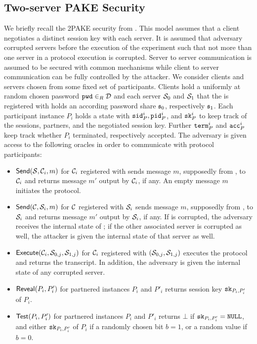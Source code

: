 \subsection{Two-server PAKE Security}
We briefly recall the \ac{2PAKE} security from \citet{Katz2012a}.
This model assumes that a client negotiates a distinct session key with each server.
It is assumed that adversary \cA corrupted servers before the execution of the experiment such that not more than one server in a protocol execution is corrupted.
Server to server communication is assumed to be secured with common mechanisms while client to server communication can be fully controlled by the attacker.
We consider clients \Client and servers \Server chosen from some fixed set of participants.
Clients hold a uniformly at random chosen password $\mathtt{pwd}\in_R\mathcal{D}$ and each server $\mathcal{S}_0$ and $\mathcal{S}_1$ that the is registered with holds an according password share $\mathfrak{s}_0$, respectively $\mathfrak{s}_1$.
Each participant instance $P_i$ holds a state with $\mathtt{sid}_P^i, \mathtt{pid}_P^i$, and $\mathtt{sk}_P^i$ to keep track of the sessions, partners, and the negotiated session key.
Further $\mathtt{term}_P^i$ and $\mathtt{acc}_P^i$ keep track whether $P_i$ terminated, respectively accepted.
The adversary is given access to the following oracles in order to communicate with protocol participants:

\begin{itemize}
  \item $\mathsf{Send}(\mathcal{S}, \mathcal{C}_i, m)$ for $\mathcal{C}_i$ registered with \Server sends message $m$, supposedly from \Server, to $\mathcal{C}_i$ and returns message $m'$ output by $\mathcal{C}_i$, if any.
    An empty message $m$ initiates the protocol.
  
  \item $\mathsf{Send}(\mathcal{C}, \mathcal{S}_i, m)$ for $\mathcal{C}$ registered with $\mathcal{S}_i$ sends message $m$, supposedly from \Client, to $\mathcal{S}_i$ and returns message $m'$ output by $\mathcal{S}_i$, if any.
    If \Server is corrupted, the adversary receives the internal state of \Server; if the other associated server is corrupted as well, the attacker is given the internal state of that server as well.
    
  \item $\mathsf{Execute}(\mathcal{C}_i, \mathcal{S}_{0,j}, \mathcal{S}_{1,j})$ for $\mathcal{C}_i$ registered with $(\mathcal{S}_{0,j},\mathcal{S}_{1,j})$ executes the protocol and returns the transcript.
    In addition, the adversary is given the internal state of any corrupted server.
  
  \item $\mathsf{Reveal}(P_i, P'_i)$ for partnered instances $P_i$ and $P'_i$ returns session key $\mathtt{sk}_{P_i,P'_i}$ of $P_i$.
  
  \item $\mathsf{Test}(P_i, P'_i)$ for partnered instances $P_i$ and $P'_i$ returns $\bot$ if $\mathtt{sk}_{P_i, P'_i}=\mathtt{NULL}$, and either $\mathtt{sk}_{P_i,P'_i}$ of $P_i$ if a randomly chosen bit $b=1$, or a random value if $b=0$.
    
\end{itemize}

